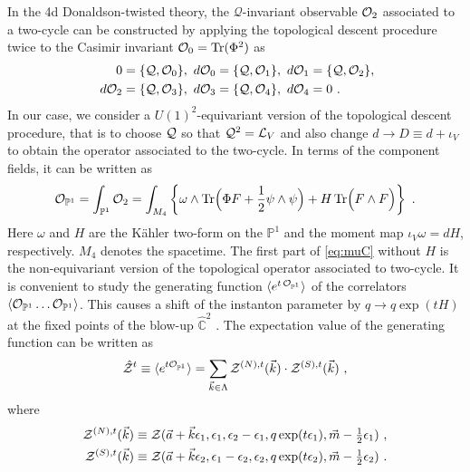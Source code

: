 \documentclass[letterpaper, 11pt]{article}
\def\IC{\mathbb{C}}
\def\IP{\mathbb{P}}
\def\CL{{\cal L}}
\def\CO{{\cal O}}
\def\CQ{{\cal Q}}
\def\CZ{{\cal Z}}
\def\e{\epsilon}
\def\half{\frac{1}{2}}
\begin{document}
In the 4d Donaldson-twisted theory, the $\mathcal{Q}$-invariant observable $\CO_2$ associated to a two-cycle can be constructed by applying the topological descent procedure twice to the Casimir invariant $\CO_0 = \text{Tr}(\Phi^2)$ as \cite{Witten:1988ze}
\begin{align}
\begin{split}
0 &= \{ \CQ, \CO_0 \}, 
~ d\CO_0 = \{\CQ, \CO_1 \}, 
~ d\CO_1 = \{\CQ, \CO_2 \}, \\
~ d\CO_2 &= \{\CQ, \CO_3 \}, 
~ d\CO_3 = \{\CQ, \CO_4 \}, 
~ d\CO_4 = 0 \ . 
\end{split}
\end{align} 
In our case, we consider a $U(1)^2$-equivariant version of the topological descent procedure, that is to choose $\CQ$ so that $\CQ^2 = \CL_V$ and also change $d \to D \equiv d + \iota_V$ to obtain the operator associated to the two-cycle. In terms of the component fields, it can be written as \cite{Bershtein:2015xfa}
\begin{align} \label{eq:muC}
  {\CO}_{\IP^1} = \int_{\IP^1} \CO_2 = \int_{M_4} \left\{ \omega \wedge \text{Tr}\Big(\Phi F + \half \psi \wedge \psi\Big) + H\, \text{Tr}\Big( F \wedge F \Big) \right\}  \ .
\end{align} 
Here $\omega$ and $H$ are the K\"ahler two-form on the $\IP^1$ and the moment map $\iota_V \omega = dH$, respectively. $M_4$ denotes the spacetime. The first part of \eqref{eq:muC} without $H$ is the non-equivariant version of the topological operator associated to two-cycle. 
It is convenient to study the generating function $\langle e^{t \, {\CO}_{\IP^1}}\rangle $ of the correlators $\langle {\CO}_{\IP^1} \ldots {\CO}_{\IP^1} \rangle$. 
This causes a shift of the instanton parameter by $q \to q \exp(t H)$ at the fixed points of the blow-up $\hat{\IC}^2$ \cite{Nakajima:2003pg,Nakajima:2003uh, Nakajima:2005fg}.  
The expectation value of the generating function can be written as
\begin{align} \label{eq:corgen}
  \hat{\CZ}^{t} \equiv \langle e^{t  {\CO}_{\IP^1}}\rangle = \sum_{\vec{k} \in \Lambda}  \CZ^{(N),t}(\vec{k}) \cdot \CZ^{(S),t}(\vec{k})\ ,  
\end{align}
where
\begin{align}
  \label{eq:param-np-sp}
\begin{split}
  \CZ^{(N),t}(\vec{k}) &\equiv \CZ(\vec{a}+\vec{k} \e_1, \e_1, \e_2-\e_1, q \exp(t \e_1), \vec{m} -\tfrac{1}{2}\e_1) \ , \\
  \CZ^{(S),t}(\vec{k}) &\equiv \CZ(\vec{a}+\vec{k} \e_2, \e_1 - \e_2, \e_2, q \exp(t \e_2), \vec{m} -\tfrac{1}{2}\e_2)\ . \\
\end{split}
\end{align}
\end{document}
